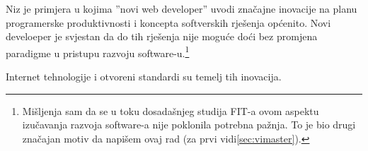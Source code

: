 \documentclass[times, utf8, seminar]{fit}
\begin{document}
Niz je primjera u kojima ''novi web developer'' uvodi značajne inovacije na planu programerske produktivnosti i koncepta softverskih rješenja općenito. Novi develoeper je svjestan da do tih rješenja nije moguće doći bez promjena paradigme u pristupu razvoju software-u.\footnote{Mišljenja sam da se u toku dosadašnjeg studija FIT-a ovom aspektu izučavanja razvoja software-a nije poklonila potrebna pažnja. To je bio drugi značajan motiv da napišem ovaj rad (za prvi vidi\ref{sec:vimaster}).}

Internet tehnologije i otvoreni standardi su temelj tih inovacija.



\end{document}
